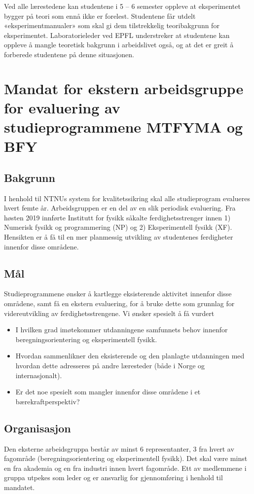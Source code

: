 \documentclass{article}
\begin{document}
Ved alle lærestedene kan studentene i 5 – 6 semester oppleve at eksperimentet bygger på teori som ennå ikke er forelest. Studentene får utdelt «eksperimentmanualer» som skal gi dem tilstrekkelig teoribakgrunn for eksperimentet. Laboratorieleder ved EPFL understreker at studentene kan oppleve å mangle teoretisk bakgrunn i arbeidslivet også, og at det er greit å forberede studentene på denne situasjonen.


\section{Mandat for ekstern arbeidsgruppe for evaluering av studieprogrammene MTFYMA og BFY}
\subsection{Bakgrunn}
I henhold til NTNUs system for kvalitetssikring skal alle studieprogram evalueres hvert femte år. Arbeidsgruppen er en del av en slik periodisk evaluering. Fra høsten 2019 innførte Institutt for fysikk såkalte ferdighetsstrenger innen 1) Numerisk fysikk og programmering (NP) og 2) Eksperimentell fysikk (XF). Hensikten er å få til en mer planmessig utvikling av studentenes ferdigheter innenfor disse områdene. 

\subsection{Mål}
Studieprogrammene ønsker å kartlegge eksisterende aktivitet innenfor disse områdene, samt få en ekstern evaluering, for å bruke dette som grunnlag for videreutvikling av ferdighetsstrengene.
Vi ønsker spesielt å få vurdert
\begin{itemize}
  \item I hvilken grad imøtekommer utdanningene samfunnets behov innenfor beregningsorientering og eksperimentell fysikk.
  \item Hvordan sammenlikner den eksisterende og den planlagte utdanningen med hvordan dette adresseres på andre læresteder (både i Norge og internasjonalt).
  \item Er det noe spesielt som mangler innenfor disse områdene i et bærekraftperspektiv?
\end{itemize}

\subsection{Organisasjon}
Den eksterne arbeidsgruppa består av minst 6 representanter, 3 fra hvert av fagområde (beregningsorientering og eksperimentell fysikk). Det skal være minst en fra akademia og en fra industri innen hvert fagområde.
Ett av medlemmene i gruppa utpekes som leder og er ansvarlig for gjennomføring i henhold til mandatet.
\end{document}
